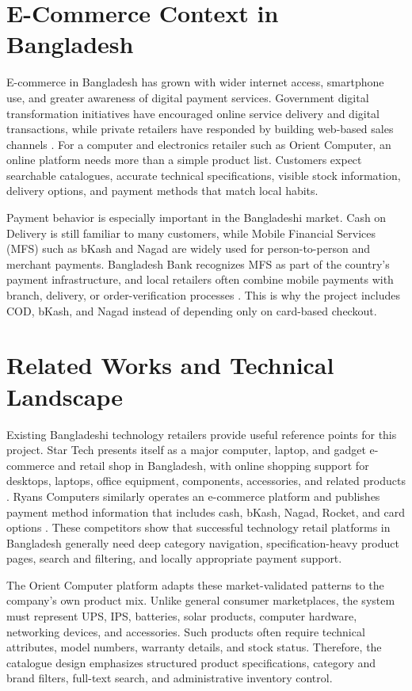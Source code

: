 \documentclass[12pt,a4paper,oneside]{report}
\begin{document}
\section{E-Commerce Context in Bangladesh}
E-commerce in Bangladesh has grown with wider internet access, smartphone use, and greater awareness of digital payment services. Government digital transformation initiatives have encouraged online service delivery and digital transactions, while private retailers have responded by building web-based sales channels \cite{a2i}. For a computer and electronics retailer such as Orient Computer, an online platform needs more than a simple product list. Customers expect searchable catalogues, accurate technical specifications, visible stock information, delivery options, and payment methods that match local habits.

Payment behavior is especially important in the Bangladeshi market. Cash on Delivery is still familiar to many customers, while Mobile Financial Services (MFS) such as bKash and Nagad are widely used for person-to-person and merchant payments. Bangladesh Bank recognizes MFS as part of the country's payment infrastructure, and local retailers often combine mobile payments with branch, delivery, or order-verification processes \cite{bangladesh_bank}. This is why the project includes COD, bKash, and Nagad instead of depending only on card-based checkout.

\section{Related Works and Technical Landscape}
Existing Bangladeshi technology retailers provide useful reference points for this project. Star Tech presents itself as a major computer, laptop, and gadget e-commerce and retail shop in Bangladesh, with online shopping support for desktops, laptops, office equipment, components, accessories, and related products \cite{startech}. Ryans Computers similarly operates an e-commerce platform and publishes payment method information that includes cash, bKash, Nagad, Rocket, and card options \cite{ryans}. These competitors show that successful technology retail platforms in Bangladesh generally need deep category navigation, specification-heavy product pages, search and filtering, and locally appropriate payment support.

The Orient Computer platform adapts these market-validated patterns to the company's own product mix. Unlike general consumer marketplaces, the system must represent UPS, IPS, batteries, solar products, computer hardware, networking devices, and accessories. Such products often require technical attributes, model numbers, warranty details, and stock status. Therefore, the catalogue design emphasizes structured product specifications, category and brand filters, full-text search, and administrative inventory control.
\end{document}
